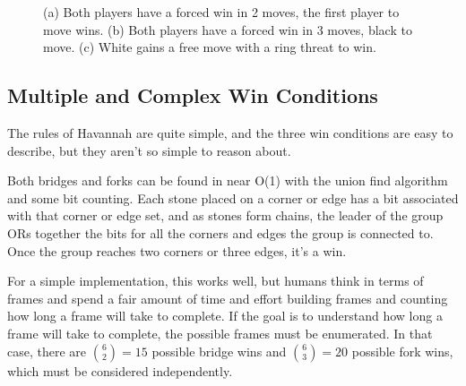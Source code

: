 \begin{figure}
	\centering
	\caption{(a) Both players have a forced win in 2 moves, the first player to move wins. (b) Both players have a forced win in 3 moves, black to move. (c) White gains a free move with a ring threat to win.}
	\label{fig:race}
\end{figure}



\subsection{Multiple and Complex Win Conditions}

The rules of Havannah are quite simple, and the three win conditions are easy to describe, but they aren't so simple to reason about.

Both bridges and forks can be found in near O(1) with the union find algorithm and some bit counting. Each stone placed on a corner or edge has a bit associated with that corner or edge set, and as stones form chains, the leader of the group ORs together the bits for all the corners and edges the group is connected to. Once the group reaches two corners or three edges, it's a win.

For a simple implementation, this works well, but humans think in terms of frames and spend a fair amount of time and effort building frames and counting how long a frame will take to complete. If the goal is to understand how long a frame will take to complete, the possible frames must be enumerated. In that case, there are ${6 \choose 2} = 15$ possible bridge wins and ${6 \choose 3} = 20$ possible fork wins, which must be considered independently.

